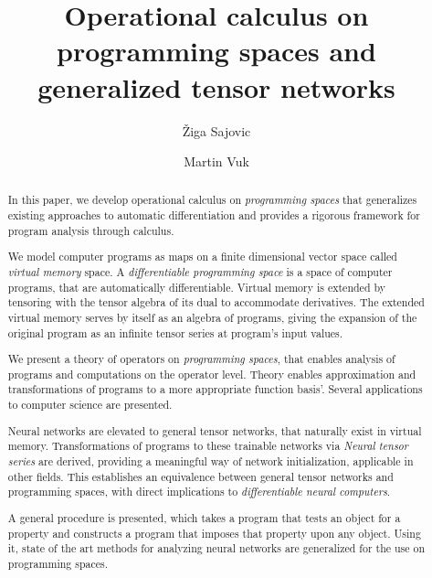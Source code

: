 \documentclass[smallcondensed]{svjour3}
\date{}
\begin{document}
\title{Operational calculus on programming spaces and generalized tensor networks}
\author{Žiga Sajovic \and Martin Vuk}
\maketitle
\begin{abstract}
In this paper, we develop operational calculus on \emph{programming spaces} that generalizes existing approaches to automatic differentiation and provides a rigorous framework for program analysis through calculus.

We model computer programs as maps on a finite dimensional vector space called
\emph{virtual memory} space. A \emph{differentiable programming space} is a
space of computer programs, that are automatically differentiable. Virtual
memory is extended by tensoring with the tensor algebra of its dual to
accommodate derivatives. The extended virtual memory serves by itself as
an algebra of programs, giving the expansion of the original program as an
infinite tensor series at program's input values.   

We present a theory of operators on \emph{programming spaces}, that enables analysis of programs
and computations on the operator level. Theory enables
approximation and transformations of programs to a more appropriate function basis'. Several applications to computer science are presented.

Neural networks are elevated to general tensor networks, that naturally exist in virtual memory.
 Transformations of programs to these trainable networks via \emph{Neural tensor series} are derived, providing a meaningful way of network initialization, applicable in other fields. This establishes an equivalence between general tensor networks and programming spaces, with direct implications to \emph{differentiable neural computers}.
 
 
A general procedure is presented, which takes a program that tests an object for a property and
constructs a program that imposes that property upon any object. 
Using it, state of the art methods for analyzing neural networks are generalized for the use on programming spaces.

\end{abstract}
\end{document}
